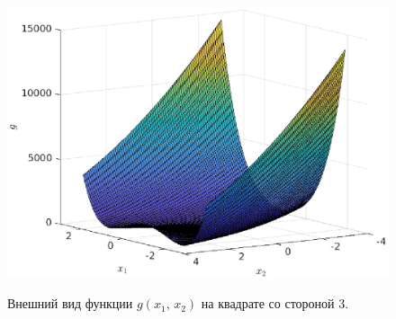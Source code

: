 \begin{figure}[b]
       \noindent
        \centering
        {
                \includegraphics[width=120mm]{task_07/g_func.eps}
        }
        \caption{Внешний вид функции $g(x_1,\,x_2)$ на квадрате со стороной 3.}
\end{figure}